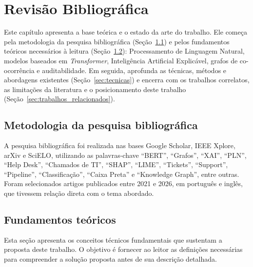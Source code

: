 \documentclass[
    12pt,                %
    openright,           %
    oneside,             %
    a4paper,             %
    english,             %
    brazil               %
]{abntex2}
\begin{document}
\chapter{Revisão Bibliográfica}
\label{cap:revisao}

Este capítulo apresenta a base teórica e o estado da arte do trabalho. Ele começa pela metodologia da pesquisa bibliográfica (Seção~\ref{sec:metodologia_pesquisa}) e pelos fundamentos teóricos necessários à leitura (Seção~\ref{sec:fundamentos}): Processamento de Linguagem Natural, modelos baseados em \textit{Transformer}, Inteligência Artificial Explicável, grafos de co-ocorrência e auditabilidade. Em seguida, aprofunda as técnicas, métodos e abordagens existentes (Seção~\ref{sec:tecnicas}) e encerra com os trabalhos correlatos, as limitações da literatura e o posicionamento deste trabalho (Seção~\ref{sec:trabalhos_relacionados}).

\section{Metodologia da pesquisa bibliográfica}
\label{sec:metodologia_pesquisa}

A pesquisa bibliográfica foi realizada nas bases Google Scholar, IEEE Xplore, arXiv e SciELO, utilizando as palavras-chave ``BERT'', ``Grafos'', ``XAI'', ``PLN'', ``Help Desk'', ``Chamados de TI'', ``SHAP'', ``LIME'', ``Tickets'', ``Support'', ``Pipeline'', ``Classificação'', ``Caixa Preta'' e ``Knowledge Graph'', entre outras. Foram selecionados artigos publicados entre 2021 e 2026, em português e inglês, que tivessem relação direta com o tema abordado.

\section{Fundamentos teóricos}
\label{sec:fundamentos}

Esta seção apresenta os conceitos técnicos fundamentais que sustentam a proposta deste trabalho. O objetivo é fornecer ao leitor as definições necessárias para compreender a solução proposta antes de sua descrição detalhada.
\end{document}
